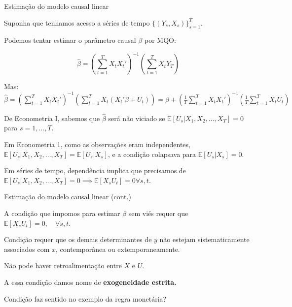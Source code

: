 \documentclass[11pt]{beamer}
\newenvironment{wideitemize}{\itemize\addtolength{\itemsep}{10pt}}{\enditemize}
\newenvironment{halfwideitemize}{\itemize\addtolength{\itemsep}{0.5em}}{\enditemize}
\begin{document}
	\begin{frame}{Estimação do modelo causal linear}
		\begin{halfwideitemize}
			\item Suponha que tenhamos acesso a séries de tempo $\{(Y_s, X_s)\}_{s=1}^T$.
			\item Podemos tentar estimar o parâmetro causal $\beta$ por MQO:
			
			$$\hat{\beta} = \left(\sum_{t=1}^T X_t X_t'\right)^{-1}\left(\sum_{t=1}^T X_t Y_T\right) $$
			\item Mas:
			$\hat{\beta}  = \left(\sum_{t=1}^T X_t X_t'\right)^{-1}\left(\sum_{t=1}^T X_t (X_t'\beta + U_t)\right)= \beta + \left(\frac{1}{T}\sum_{t=1}^T X_t X_t'\right)^{-1}\left(\frac{1}{T}\sum_{t=1}^T X_t U_t\right)  $
			\item De Econometria I, sabemos que $\hat{\beta}$ será não viciado se {\color{blue_emph}$\mathbb{E}[U_s|X_1,X_2,\ldots, X_T]=0$} para $s=1,\ldots,T$.
			\begin{halfwideitemize}
				\item Em Econometria 1, como as observações eram independentes, $\mathbb{E}[U_s|X_1,X_2,\ldots, X_T] = \mathbb{E}[U_s|X_s]$, e a condição colapsava para $\mathbb{E}[U_s|X_s] = 0$.
				\item Em séries de tempo, dependência implica que precisamos de $\mathbb{E}[U_s|X_1,X_2,\ldots, X_T] = 0 \implies \mathbb{E}[X_sU_t] = 0 \forall s,t $.
			\end{halfwideitemize}
		\end{halfwideitemize}
	\end{frame}
	\begin{frame}{Estimação do modelo causal linear (cont.)}
		\begin{wideitemize}
			\item A condição que impomos para estimar $\beta$ {\color{blue}sem viés} requer que $\mathbb{E}[X_sU_t] = 0, \quad \forall s,t$.
			\begin{halfwideitemize}
				\item Condição requer que os demais determinantes de $y$ não estejam sistematicamente associados com $x$, contemporânea ou extemporaneamente.
				\item Não pode haver retroalimentação entre $X$ e $U$.
				\item A essa condição damos nome de \textbf{exogeneidade estrita.}
			\end{halfwideitemize}
			\item Condição faz sentido no exemplo da regra monetária?
		\end{wideitemize}
	\end{frame}
\end{document}
